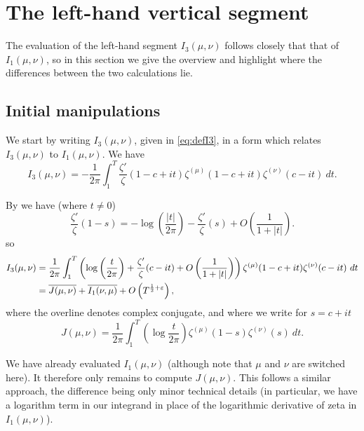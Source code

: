 \documentclass[12pt, a4paper,reqno]{amsart}
\theoremstyle{definition}
\numberwithin{equation}{section}
\begin{document}
\section{The left-hand vertical segment}\label{sect:left_vertical}
The evaluation of the left-hand segment $I_3(\mu,\nu)$ follows closely that that of $I_1(\mu,\nu)$, so in this section we give the overview and highlight where the differences between the two calculations lie.

\subsection{Initial manipulations} \hfill


We start by writing $I_3(\mu,\nu)$, given in \eqref{eq:defI3}, in a form which relates $I_3(\mu,\nu)$ to $I_1(\mu,\nu)$. We have 
\begin{equation*}
    I_3(\mu,\nu) = -\frac{1}{2\pi}\int_1^T\frac{\zeta'}{\zeta}(1-c+it)\zeta^{(\mu)}(1-c+it)\zeta^{(\nu)}(c-it)\ dt.
\end{equation*}

By \cite[Lemma 6]{Gonek1984} we have (where $t\ne 0$)
\begin{equation}\label{logfe2}
    \frac{\zeta'}{\zeta}(1-s)=-\log\left(\frac{|t|}{2\pi}\right)-\frac{\zeta'}{\zeta}(s)+O\left(\frac{1}{1+|t|}\right).
\end{equation}
so
\begin{align}
    I_3(\mu,\nu) &= \frac{1}{2\pi}\int_1^T\left(\log\left(\frac{t}{2\pi}\right)+\frac{\zeta'}{\zeta}(c-it)+O\left(\frac{1}{1+|t|}\right)\right)\zeta^{(\mu)}(1-c+it)\zeta^{(\nu)}(c-it)\ dt \notag\\
    &=\overline{J(\mu,\nu)} + \overline{I_1(\nu,\mu)}+O\left( T^{\frac{1}{2}+\varepsilon} \right), \label{eq:I_3}
\end{align}
where the overline denotes complex conjugate, and where we write for $s=c+it$
\begin{equation*}
    J(\mu,\nu)=\frac{1}{2\pi}\int_1^T\left(\log \frac{t}{2\pi}\right)\zeta^{(\mu)}(1-s)\zeta^{(\nu)}(s)\ dt.
\end{equation*}

We have already evaluated $I_1(\mu,\nu)$ (although note that $\mu$ and $\nu$ are switched here). It therefore only remains to compute $J(\mu,\nu)$. This follows a similar approach, the difference being only minor technical details (in particular, we have a logarithm term in our integrand in place of the logarithmic derivative of zeta in $I_1(\mu,\nu)$).
\end{document}
